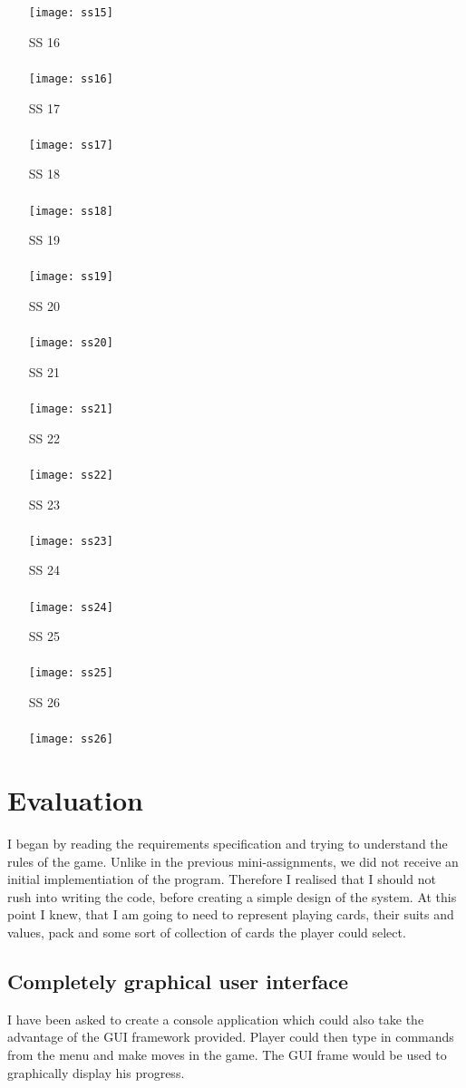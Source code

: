 \documentclass[a4paper, 12pt, titlepage]{article}
\begin{document}
\begin{enumerate}
		\texttt{[image: ss15]}
	\item[SS]16\\\\ 
		\texttt{[image: ss16]}
	\item[SS]17\\\\ 
		\texttt{[image: ss17]}
	\item[SS]18\\\\ 
		\texttt{[image: ss18]}
	\item[SS]19\\\\ 
		\texttt{[image: ss19]}
	\item[SS]20\\\\ 
		\texttt{[image: ss20]}
	\item[SS]21\\\\ 
		\texttt{[image: ss21]}
	\item[SS]22\\\\ 
		\texttt{[image: ss22]}
	\item[SS]23\\\\ 
		\texttt{[image: ss23]}
	\item[SS]24\\\\ 
		\texttt{[image: ss24]}
	\item[SS]25\\\\ 
		\texttt{[image: ss25]}
	\item[SS]26\\\\ 
		\texttt{[image: ss26]}		
\end{enumerate}
\section{Evaluation}
I began by reading the requirements specification and trying to understand the rules
of the game. Unlike in the previous mini-assignments, we did not receive an initial 
implementiation of the program. Therefore I realised that I should not rush into 
writing the code, before creating a simple design of the system. At this point I knew,
that I am going to need to represent playing cards, their suits and values, pack and 
some sort of collection of cards the player could select. 

\subsection{Completely graphical user interface}
I have been asked to create a console application which could also take the advantage of 
the GUI framework provided. Player could then type in commands from the menu and 
make moves in the game. The GUI frame would be used to graphically display his progress. 
\end{document}
